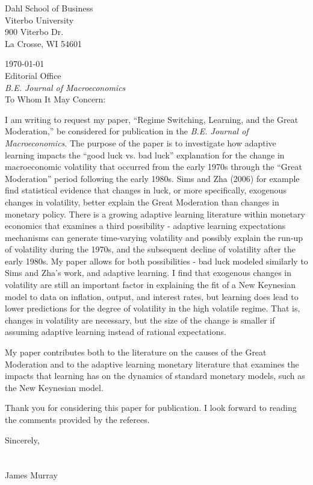 \documentclass[12pt]{letter}
\begin{document}
\vspace*{-0.5in}

Dahl School of Business\\
Viterbo University\\
900 Viterbo Dr.\\
La Crosse, WI  54601

\today\\

Editorial Office\\
\textit{B.E. Journal of Macroeconomics}\\ 

To Whom It May Concern:

I am writing to request my paper, ``Regime Switching, Learning, and the Great Moderation,'' be considered for publication in the \textit{B.E. Journal of Macroeconomics}.  The purpose of the paper is to investigate how adaptive learning impacts the ``good luck vs. bad luck'' explanation for the change in macroeconomic volatility that occurred from the early 1970s through the ``Great Moderation'' period following the early 1980s.  Sims and Zha (2006) for example find statistical evidence that changes in luck, or more specifically, exogenous changes in volatility, better explain the Great Moderation than changes in monetary policy.  There is a growing adaptive learning literature within monetary economics that examines a third possibility - adaptive learning expectations mechanisms can generate time-varying volatility and possibly explain the run-up of volatility during the 1970s, and the subsequent decline of volatility after the early 1980s.  My paper allows for both possibilities - bad luck modeled similarly to Sims and Zha's work, and adaptive learning.  I find that exogenous changes in volatility are still an important factor in explaining the fit of a New Keynesian model to data on inflation, output, and interest rates, but learning does lead to lower predictions for the degree of volatility in the high volatile regime.  That is, changes in volatility are necessary, but the size of the change is smaller if assuming adaptive learning instead of rational expectations.

My paper contributes both to the literature on the causes of the Great Moderation and to the adaptive learning monetary literature that examines the impacts that learning has on the dynamics of standard monetary models, such as the New Keynesian model. 

Thank you for considering this paper for publication.  I look forward to reading the comments provided by the referees.

Sincerely,\\\\\\
James Murray
\end{document}
